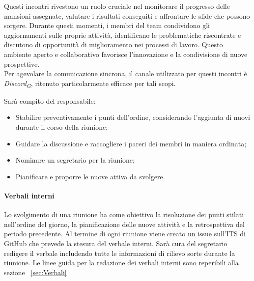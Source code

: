 \documentclass{article}
\begin{document}
Questi incontri rivestono un ruolo cruciale nel monitorare il progresso delle mansioni assegnate, valutare i risultati conseguiti e affrontare le sfide che possono sorgere. Durante questi momenti, i membri del team condividono gli aggiornamenti sulle proprie attività, identificano le problematiche riscontrate e discutono di opportunità di miglioramento nei processi di lavoro. Questo ambiente aperto e collaborativo favorisce l'innovazione e la condivisione di nuove prospettive.\\

Per agevolare la comunicazione sincrona, il canale utilizzato per questi incontri è \textit{Discord}\textsubscript{\textit{G}}, ritenuto particolarmente efficace per tali scopi.

\vspace{0,1cm}

Sarà compito del responsabile:
\begin{itemize}
    \item Stabilire preventivamente i punti dell'ordine, considerando l'aggiunta di nuovi durante il corso della riunione;
    \item Guidare la discussione e raccogliere i pareri dei membri in maniera ordinata;
    \item Nominare un segretario per la riunione;
    \item Pianificare e proporre le nuove attiva da svolgere.
\end{itemize}
\paragraph*{Verbali interni}
Lo svolgimento di una riunione ha come obiettivo la risoluzione dei punti stilati nell'ordine del giorno, la pianificazione delle nuove attività e la retrospettiva del periodo precedente.
Al termine di ogni riunione viene creato un issue sull'ITS di GitHub che prevede la stesura del verbale interni. Sarà cura del segretario redigere il verbale includendo
tutte le informazioni di rilievo sorte durante la riunione.
Le linee guida per la redazione dei verbali interni sono reperibili alla sezione  ~\ref{sec:Verbali}
\end{document}
